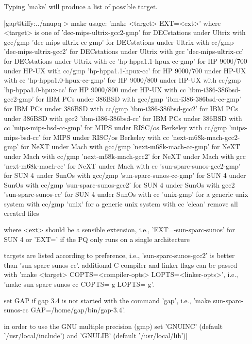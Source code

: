 Typing 'make' will produce a list of possible target.

|gap@tiffy:../anupq > make
usage: 'make <target> EXT=<ext>'  where <target> is one of
'dec-mips-ultrix-gcc2-gmp' for DECstations under Ultrix with gcc/gmp
'dec-mips-ultrix-cc-gmp'   for DECstations under Ultrix with cc/gmp
'dec-mips-ultrix-gcc2'     for DECstations under Ultrix with gcc
'dec-mips-ultrix-cc'       for DECstations under Ultrix with cc
'hp-hppa1.1-hpux-cc-gmp'   for HP 9000/700 under HP-UX with cc/gmp
'hp-hppa1.1-hpux-cc'       for HP 9000/700 under HP-UX with cc
'hp-hppa1.0-hpux-cc-gmp'   for HP 9000/800 under HP-UX with cc/gmp
'hp-hppa1.0-hpux-cc'       for HP 9000/800 under HP-UX with cc
'ibm-i386-386bsd-gcc2-gmp' for IBM PCs under 386BSD with gcc/gmp
'ibm-i386-386bsd-cc-gmp'   for IBM PCs under 386BSD with cc/gmp
'ibm-i386-386bsd-gcc2'     for IBM PCs under 386BSD with gcc2
'ibm-i386-386bsd-cc'       for IBM PCs under 386BSD with cc
'mips-mips-bsd-cc-gmp'     for MIPS under RISC/os Berkeley with cc/gmp
'mips-mips-bsd-cc'         for MIPS under RISC/os Berkeley with cc
'next-m68k-mach-gcc2-gmp'  for NeXT under Mach with gcc/gmp
'next-m68k-mach-cc-gmp'    for NeXT under Mach with cc/gmp
'next-m68k-mach-gcc2'      for NeXT under Mach with gcc
'next-m68k-mach-cc'        for NeXT under Mach with cc
'sun-sparc-sunos-gcc2-gmp' for SUN 4 under SunOs with gcc/gmp
'sun-sparc-sunos-cc-gmp'   for SUN 4 under SunOs with cc/gmp
'sun-sparc-sunos-gcc2'     for SUN 4 under SunOs with gcc2
'sun-sparc-sunos-cc'       for SUN 4 under SunOs with cc
'unix-gmp'                 for a generic unix system with cc/gmp
'unix'                     for a generic unix system with cc
'clean'                    remove all created files

   where <ext> should be a sensible extension, i.e.,
   'EXT=-sun-sparc-sunos' for SUN 4 or 'EXT=' if the PQ only
   runs on a single architecture

   targets are listed according to preference,
   i.e., 'sun-sparc-sunos-gcc2' is better than 'sun-sparc-sunos-cc'.
   additional C compiler and linker flags can be passed with
   'make <target> COPTS=<compiler-opts> LOPTS=<linker-opts>',
   i.e., 'make sun-sparc-sunos-cc COPTS=-g LOPTS=-g'.

   set GAP if gap 3.4 is not started with the command 'gap',
   i.e., 'make sun-sparc-sunos-cc GAP=/home/gap/bin/gap-3.4'.

   in order to use the GNU multiple precision (gmp) set
   'GNUINC' (default '/usr/local/include') and 
   'GNULIB' (default '/usr/local/lib')|

